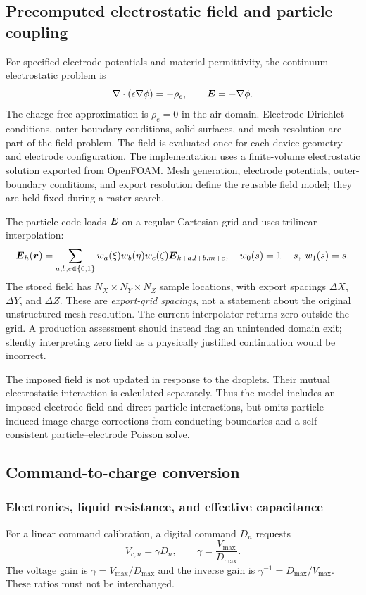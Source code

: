 \subsection{Precomputed electrostatic field and particle coupling}
For specified electrode potentials and material permittivity, the continuum electrostatic problem is
\begin{equation}
 \nabla\cdot(\epsilon\nabla\phi)=-\rho_e,\qquad \boldsymbol{E}=-\nabla\phi.
\label{eq:field}
\end{equation}
The charge-free approximation is $\rho_e=0$ in the air domain. Electrode Dirichlet conditions, outer-boundary conditions, solid surfaces, and mesh resolution are part of the field problem. The field is evaluated once for each device geometry and electrode configuration. The implementation uses a finite-volume electrostatic solution exported from OpenFOAM. Mesh generation, electrode potentials, outer-boundary conditions, and export resolution define the reusable field model; they are held fixed during a raster search.

The particle code loads $\boldsymbol{E}$ on a regular Cartesian grid and uses trilinear interpolation:
\begin{equation}
 \boldsymbol{E}_h(\boldsymbol{r})=\sum_{a,b,c\in\{0,1\}}
 w_a(\xi)w_b(\eta)w_c(\zeta)\boldsymbol{E}_{k+a,l+b,m+c},
 \quad w_0(s)=1-s,\;w_1(s)=s.
\end{equation}
The stored field has $N_X\times N_Y\times N_Z$ sample locations, with export spacings $\Delta X$, $\Delta Y$, and $\Delta Z$. These are \emph{export-grid spacings}, not a statement about the original unstructured-mesh resolution. The current interpolator returns zero outside the grid. A production assessment should instead flag an unintended domain exit; silently interpreting zero field as a physically justified continuation would be incorrect.

The imposed field is not updated in response to the droplets. Their mutual electrostatic interaction is calculated separately. Thus the model includes an imposed electrode field and direct particle interactions, but omits particle-induced image-charge corrections from conducting boundaries and a self-consistent particle--electrode Poisson solve.

\subsection{Command-to-charge conversion}
\subsubsection{Electronics, liquid resistance, and effective capacitance}
For a linear command calibration, a digital command $D_n$ requests
\begin{equation}
 V_{c,n}=\gamma D_n,\qquad \gamma=\frac{V_{\max}}{D_{\max}}.
\end{equation}
The voltage gain is $\gamma=V_{\max}/D_{\max}$ and the inverse gain is $\gamma^{-1}=D_{\max}/V_{\max}$. These ratios must not be interchanged.


